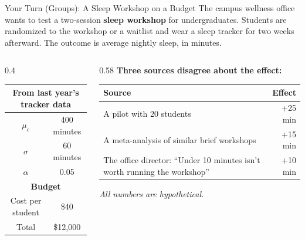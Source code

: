 \documentclass[
  ignorenonframetext,
  aspectratio=169,
]{beamer}
\begin{document}
\begin{frame}{Your Turn (Groups): A Sleep Workshop on a Budget}
\label{your-turn-groups-a-sleep-workshop-on-a-budget}
\small The campus wellness office wants to test a two-session
\textbf{sleep workshop} for undergraduates. Students are randomized to
the workshop or a waitlist and wear a sleep tracker for two weeks
afterward. The outcome is average nightly sleep, in minutes.

\vspace{0.4em}

\begin{columns}[T]
\begin{column}{0.4\linewidth}
\begin{center}
\footnotesize
\setlength{\tabcolsep}{6pt}
\renewcommand{\arraystretch}{1.2}
\begin{tabular}{cc}
\toprule
\multicolumn{2}{c}{\textbf{From last year's tracker data}} \\
\midrule
$\mu_c$  & 400 minutes \\
$\sigma$ & 60 minutes \\
$\alpha$ & 0.05 \\
\midrule
\multicolumn{2}{c}{\textbf{Budget}} \\
\midrule
Cost per student & \$40 \\
Total            & \$12{,}000 \\
\bottomrule
\end{tabular}
\end{center}
\end{column}

\begin{column}{0.58\linewidth}
\footnotesize
\textbf{Three sources disagree about the effect:}

\vspace{0.3em}

\begin{tabular}{>{\raggedright\arraybackslash}p{5.6cm}r}
\toprule
\textbf{Source} & \textbf{Effect} \\
\midrule
A pilot with 20 students & +25 min \\
A meta-analysis of similar brief workshops & +15 min \\
The office director: ``Under 10 minutes isn't worth running the workshop'' & +10 min \\
\bottomrule
\end{tabular}

\vspace{0.4em}

\textit{All numbers are hypothetical.}
\end{column}
\end{columns}
\end{frame}
\end{document}
